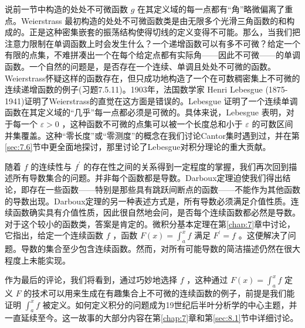 说前一节中构造的处处不可微函数 \(g\) 在其定义域的每一点都有“角”略微偏离了重点。Weierstrass 最初构造的处处不可微函数类是由无限多个光滑三角函数的和构成的。正是这种密集嵌套的振荡结构使得切线的定义变得不可能。那么，当我们把注意力限制在单调函数上时会发生什么？一个递增函数可以有多不可微？给定一个有限的点集，不难拼凑出一个在每个给定点都有实际角——因此不可微——的单调函数。一个自然的问题是，是否存在一个连续、单调且处处不可微的函数。Weierstrass怀疑这样的函数存在，但只成功地构造了一个在可数稠密集上不可微的连续递增函数的例子(习题7.5.11)。1903年，法国数学家 Henri Lebesgue (1875-1941)证明了Weierstrass的直觉在这方面是错误的。Lebesgue 证明了一个连续单调函数在其定义域的“几乎”每一点都必须是可微的。具体来说，Lebesgue 表明，对于每一个 \(\varepsilon  > 0\) ，这种函数不可微的点集可以被一个长度总和小于 \(\varepsilon\) 的可数区间并集覆盖。这种“零长度”或“零测度”的概念在我们讨论Cantor集时遇到过，并在第\ref{sec:7.6}节中更全面地探讨，那里讨论了Lebesgue对积分理论的重大贡献。

随着 \(f\) 的连续性与 \({f}^{\prime }\) 的存在性之间的关系得到一定程度的掌握，我们再次回到描述所有导数集合的问题。并非每个函数都是导数。Darboux定理迫使我们得出结论，即存在一些函数——特别是那些具有跳跃间断点的函数——不能作为其他函数的导数出现。Darboux定理的另一种表述方式是，所有导数必须满足介值性质。连续函数确实具有介值性质，因此很自然地会问，是否每个连续函数都必然是导数。对于这个较小的函数类，答案是肯定的。微积分基本定理在第\ref{chap:7}章中讨论，它指出，给定一个连续函数 \(f\) ，函数 \(F\left( x\right)  = {\int }_{a}^{x}f\) 满足 \({F}^{\prime } = f\) 。这便解决了问题。导数的集合至少包含连续函数。然而，对所有可能导数的简洁描述仍然在很大程度上未能实现。

作为最后的评论，我们将看到，通过巧妙地选择 \(f\) ，这种通过 \(F\left( x\right)  = {\int }_{a}^{x}f\) 定义 \(F\) 的技术可以用来生成在有趣集合上不可微的连续函数的例子，前提是我们能证明 \({\int }_{a}^{x}f\) 被定义。如何定义积分的问题成为19世纪后半叶分析学的中心主题，并一直延续至今。这一故事的大部分内容在第\ref{chap:7}章和第\ref{sec:8.1}节中详细讨论。
